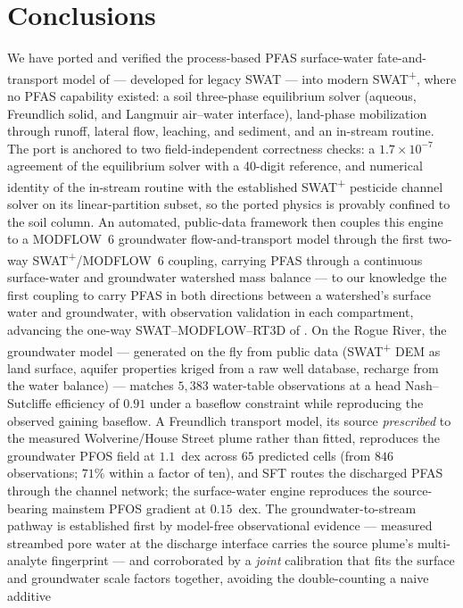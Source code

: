 \section{Conclusions}

We have ported and verified the process-based PFAS surface-water fate-and-transport model of
\citet{rafiei2023pfas} --- developed for legacy SWAT --- into modern SWAT\textsuperscript{+}, where no
PFAS capability existed: a soil three-phase equilibrium solver (aqueous, Freundlich solid, and Langmuir
air--water interface), land-phase mobilization through runoff, lateral flow, leaching, and sediment, and
an in-stream routine. The port is anchored to two field-independent correctness checks: a
$1.7\times10^{-7}$ agreement of the equilibrium solver with a 40-digit reference, and numerical identity
of the in-stream routine with the established SWAT\textsuperscript{+} pesticide channel solver on its
linear-partition subset, so the ported physics is provably confined to the soil column. An automated, public-data framework then couples this
engine to a MODFLOW~6 groundwater flow-and-transport model through the first two-way
SWAT\textsuperscript{+}/MODFLOW~6 coupling, carrying PFAS through a continuous surface-water and
groundwater watershed mass balance --- to our knowledge the first coupling to carry PFAS in both
directions between a watershed's surface water and groundwater, with observation validation in each
compartment, advancing the one-way SWAT--MODFLOW--RT3D of \citet{rafiei2023pfas}. On the
Rogue River, the groundwater model ---
generated on the fly from public data (SWAT\textsuperscript{+} DEM as land surface, aquifer
properties kriged from a raw well database, recharge from the water balance) --- matches $5{,}383$
water-table observations at a head Nash--Sutcliffe efficiency of $0.91$ under a baseflow constraint
while reproducing the observed gaining baseflow. A Freundlich transport model, its source
\emph{prescribed} to the measured Wolverine/House Street plume rather than fitted, reproduces the
groundwater PFOS field at $1.1$~dex across $65$ predicted cells (from $846$ observations; $71\%$
within a factor of ten), and SFT routes the
discharged PFAS through the channel network; the surface-water engine reproduces the source-bearing
mainstem PFOS gradient at $0.15$~dex. The groundwater-to-stream pathway is established first by
model-free observational evidence --- measured streambed pore water at the discharge interface carries
the source plume's multi-analyte fingerprint --- and corroborated by a \emph{joint} calibration that
fits the surface and groundwater scale factors together, avoiding the double-counting a naive additive

